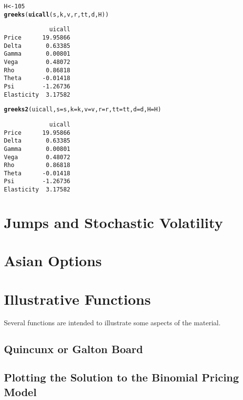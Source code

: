\documentclass{article}\usepackage[]{graphicx}\usepackage[]{color}
\makeatletter
\newcommand{\hlnum}[1]{\textcolor[rgb]{0.686,0.059,0.569}{#1}}%
\newcommand{\hlstd}[1]{\textcolor[rgb]{0.345,0.345,0.345}{#1}}%
\newcommand{\hlkwb}[1]{\textcolor[rgb]{0.69,0.353,0.396}{#1}}%
\newcommand{\hlkwc}[1]{\textcolor[rgb]{0.333,0.667,0.333}{#1}}%
\newcommand{\hlkwd}[1]{\textcolor[rgb]{0.737,0.353,0.396}{\textbf{#1}}}%
\newenvironment{kframe}{%
 \def\at@end@of@kframe{}%
 \ifinner\ifhmode%
  \def\at@end@of@kframe{\end{minipage}}%
  \begin{minipage}{\columnwidth}%
 \fi\fi%
 \def\FrameCommand##1{\hskip\@totalleftmargin \hskip-\fboxsep
 \colorbox{shadecolor}{##1}\hskip-\fboxsep
     \hskip-\linewidth \hskip-\@totalleftmargin \hskip\columnwidth}%
 \MakeFramed {\advance\hsize-\width
   \@totalleftmargin\z@ \linewidth\hsize
   \@setminipage}}%
 {\par\unskip\endMakeFramed%
 \at@end@of@kframe}
\newenvironment{knitrout}{}{} %
\makeatother
\begin{document}
\begin{knitrout}\footnotesize
{}\color{fgcolor}\begin{kframe}
\begin{alltt}
\hlstd{H} \hlkwb{<-} \hlnum{105}
\hlkwd{greeks}\hlstd{(}\hlkwd{uicall}\hlstd{(s, k, v, r, tt, d, H))}
\end{alltt}
\begin{verbatim}
             uicall
Price      19.95866
Delta       0.63385
Gamma       0.00801
Vega        0.48072
Rho         0.86818
Theta      -0.01418
Psi        -1.26736
Elasticity  3.17582
\end{verbatim}
\begin{alltt}
\hlkwd{greeks2}\hlstd{(uicall,} \hlkwc{s}\hlstd{=s,} \hlkwc{k}\hlstd{=k,} \hlkwc{v}\hlstd{=v,} \hlkwc{r}\hlstd{=r,} \hlkwc{tt}\hlstd{=tt,} \hlkwc{d}\hlstd{=d,} \hlkwc{H}\hlstd{=H)}
\end{alltt}
\begin{verbatim}
             uicall
Price      19.95866
Delta       0.63385
Gamma       0.00801
Vega        0.48072
Rho         0.86818
Theta      -0.01418
Psi        -1.26736
Elasticity  3.17582
\end{verbatim}
\end{kframe}
\end{knitrout}


\section{Jumps and Stochastic Volatility}
\label{sec:jumps}

\section{Asian Options}
 
\section{Illustrative Functions}


Several functions are intended to illustrate some aspects of the
material. 

\subsection{Quincunx or Galton Board}




\subsection{Plotting the Solution to the Binomial Pricing Model}
\label{sec:binomplot}
\end{document}
